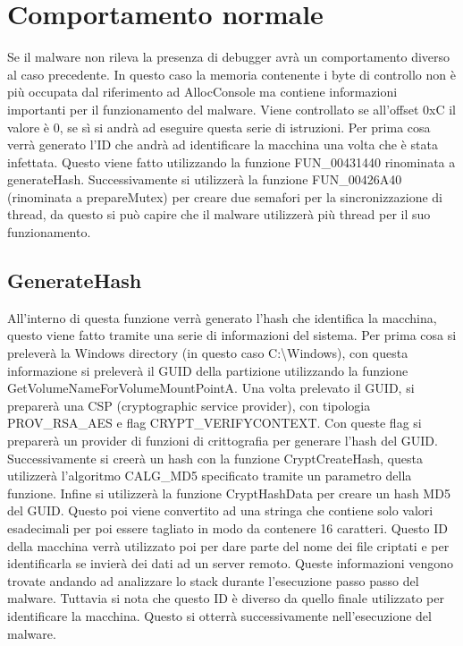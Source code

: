 \documentclass[a4paper,12pt]{article}
\begin{document}
\section{Comportamento normale}
Se il malware non rileva la presenza di debugger avrà un comportamento diverso al caso precedente. In questo caso la memoria contenente i byte di controllo non è più occupata dal riferimento ad AllocConsole ma contiene informazioni importanti per il funzionamento del malware. Viene controllato se all'offset 0xC il valore è 0, se sì si andrà ad eseguire questa serie di istruzioni. 
Per prima cosa verrà generato l'ID che andrà ad identificare la macchina una volta che è stata infettata. Questo viene fatto utilizzando la funzione FUN\_00431440 rinominata a generateHash. Successivamente si utilizzerà la funzione FUN\_00426A40 (rinominata a prepareMutex) per creare due semafori per la sincronizzazione di thread, da questo si può capire che il malware utilizzerà più thread per il suo funzionamento. 

\subsection{GenerateHash}
All'interno di questa funzione verrà generato l'hash che identifica la macchina, questo viene fatto tramite una serie di informazioni del sistema. Per prima cosa si preleverà la Windows directory (in questo caso C:\textbackslash Windows), con questa informazione si preleverà il GUID della partizione utilizzando la funzione GetVolumeNameForVolumeMountPointA. Una volta prelevato il GUID, si preparerà una CSP (cryptographic service provider), con tipologia PROV\_RSA\_AES e flag CRYPT\_VERIFYCONTEXT. Con queste flag si preparerà un provider di funzioni di crittografia per generare l'hash del GUID. Successivamente si creerà un hash con la funzione CryptCreateHash, questa utilizzerà l'algoritmo CALG\_MD5 specificato tramite un parametro della funzione. Infine si utilizzerà la funzione CryptHashData per creare un hash MD5 del GUID. Questo poi viene convertito ad una stringa che contiene solo valori esadecimali per poi essere tagliato in modo da contenere 16 caratteri. Questo ID della macchina verrà utilizzato poi per dare parte del nome dei file criptati e per identificarla se invierà dei dati ad un server remoto. Queste informazioni vengono trovate andando ad analizzare lo stack durante l'esecuzione passo passo del malware. Tuttavia si nota che questo ID è diverso da quello finale utilizzato per identificare la macchina. Questo si otterrà successivamente nell'esecuzione del malware.
\end{document}
